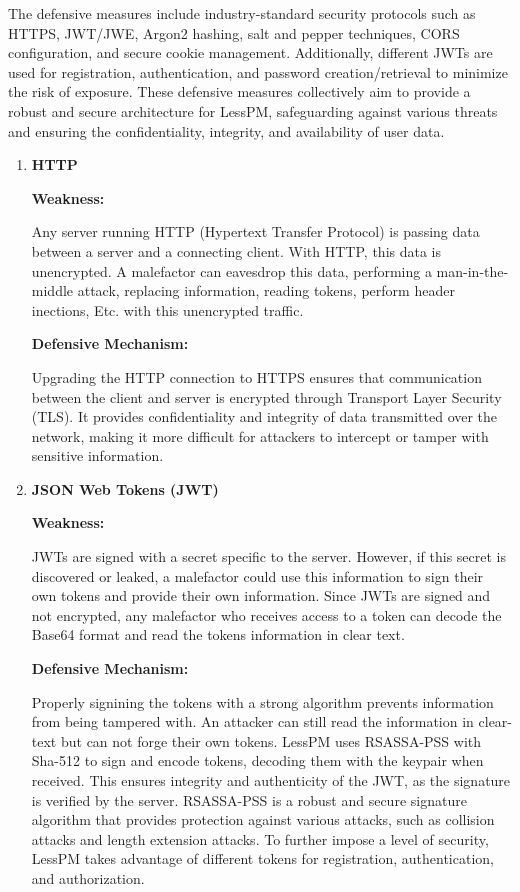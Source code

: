 The defensive measures include industry-standard security protocols such as
  HTTPS, JWT/JWE, Argon2 hashing, salt and pepper techniques, CORS
  configuration, and secure cookie management.
Additionally, different JWTs are used for registration, authentication, and
  password creation/retrieval to minimize the risk of exposure.
These defensive measures collectively aim to provide a robust and secure
  architecture for LessPM, safeguarding against various threats and ensuring
  the confidentiality, integrity, and availability of user data.
\begin{enumerate}[label=$\blacktriangleright$]
  \item \textbf{HTTP}

  \textbf{Weakness:}

  Any server running HTTP (Hypertext Transfer Protocol) is passing data
  between a server and a connecting client.
  With HTTP, this data is unencrypted.
  A malefactor can eavesdrop this data, performing a man-in-the-middle attack,
  replacing information, reading tokens, perform header inections, Etc. with 
  this unencrypted traffic.

  \textbf{Defensive Mechanism:}

  Upgrading the HTTP connection to HTTPS ensures that communication between the
  client and server is encrypted through Transport Layer Security (TLS).
  It provides confidentiality and integrity of data transmitted over the
  network, making it more difficult for attackers to intercept or tamper with
  sensitive information.

  \item \textbf{JSON Web Tokens (JWT)}

  \textbf{Weakness:}

  JWTs are signed with a secret specific to the server.
  However, if this secret is discovered or leaked, a malefactor could use this
  information to sign their own tokens and provide their own information.
  Since JWTs are signed and not encrypted, any malefactor who receives access
  to a token can decode the Base64 format and read the tokens information in
  clear text.

  \textbf{Defensive Mechanism:}

  Properly signining the tokens with a strong algorithm prevents information
  from being tampered with.
  An attacker can still read the information in clear-text but can not forge
  their own tokens.
  LessPM uses RSASSA-PSS with Sha-512 to sign and encode tokens, decoding
  them with the keypair when received.
  This ensures integrity and authenticity of the JWT, as the signature is
  verified by the server.
  RSASSA-PSS is a robust and secure signature algorithm that provides protection
  against various attacks, such as collision attacks and length extension
  attacks.
  To further impose a level of security, LessPM takes advantage of different
  tokens for registration, authentication, and authorization.


\end{enumerate}
